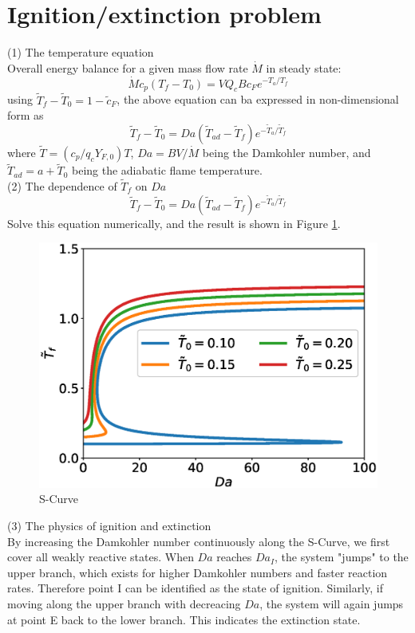 \documentclass[a4paper, 11pt]{article}
\begin{document}
\section{Ignition/extinction problem}

(1) The temperature equation\\
Overall energy balance for a given mass flow rate $\dot{M}$ in steady state:
$$
\dot{M}c_p(T_f-T_0)=VQ_cBc_Fe^{-T_a/T_f}
$$
using $\tilde{T}_f-\tilde{T}_0=1-\tilde{c}_F$, the above equation can ba expressed in non-dimensional form as
$$
\tilde{T}_f-\tilde{T}_0=Da(\tilde{T}_{ad} - \tilde{T}_f) e^{-\tilde{T}_a / \tilde{T}_f}
$$
where $\tilde{T}=(c_p/q_cY_{F,0})T$, $Da=BV/\dot{M}$ being the Damkohler number, and $\tilde{T}_{ad}=a+\tilde{T}_0$ being the adiabatic flame temperature.\\

(2) The dependence of $\tilde{T}_f$ on $Da$\\
$$
\tilde{T}_f-\tilde{T}_0=Da(\tilde{T}_{ad} - \tilde{T}_f) e^{-\tilde{T}_a / \tilde{T}_f}
$$
Solve this equation numerically, and the result is shown in Figure \ref{fig:sCurve}.\\

\begin{figure}[htpb]
\centering
\includegraphics[scale=0.5]{SCurve.eps}
\caption{S-Curve}
\label{fig:sCurve}
\end{figure}

(3) The physics of ignition and extinction\\
By increasing the Damkohler number continuously along the S-Curve, we first cover all weakly reactive states. When $Da$ reaches $Da_I$, the system "jumps" to the upper branch, which exists for higher Damkohler numbers and faster reaction rates. Therefore point I can be identified as the state of ignition. Similarly, if moving along the upper branch with decreacing $Da$, the system will again jumps at point E back to the lower branch. This indicates the extinction state.
\end{document}
